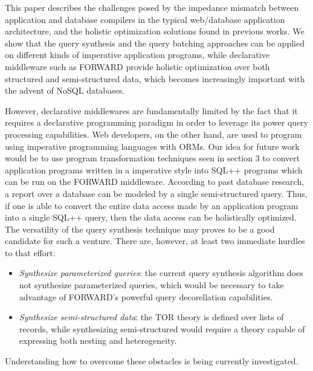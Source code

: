 This paper describes the challenges posed by the impedance mismatch between application and database compilers in the typical web/database application architecture, and the holistic optimization solutions found in previous works. We show that the query synthesis and the query batching approaches can be applied on different kinds of imperative application programs, while declarative middleware such as FORWARD provide holistic optimization over both structured and semi-structured data, which becomes increasingly important with the advent of NoSQL databases.

However, declarative middlewares are fundamentally limited by the fact that it requires a declarative programming paradigm in order to leverage its power query processing capabilities. Web developers, on the other hand, are used to program using imperative programming languages with ORMs. Our idea for future work would be to use program transformation techniques seen in section 3 to convert application programs written in a imperative style into SQL++ programs which can be run on the FORWARD middleware. According to past database research, a report over a database can be modeled by a single semi-structured query. Thus, if one is able to convert the entire data access made by an application program into a single SQL++ query, then the data access can be holistically optimized. The versatility of the query synthesis technique may proves to be a good candidate for such a venture. There are, however, at least two immediate hurdles to that effort:

\begin{itemize}
\item{\emph{Synthesize parameterized queries}: the current query synthesis algorithm does not synthesize parameterized queries, which would be necessary to take advantage of FORWARD's powerful query decorellation capabilities.}
\item{\emph{Synthesize semi-structured data}: the TOR theory is defined over lists of records, while synthesizing semi-structured would require a theory capable of expressing both nesting and heterogeneity.}
\end{itemize}

Understanding how to overcome these obstacles is being currently investigated. 
